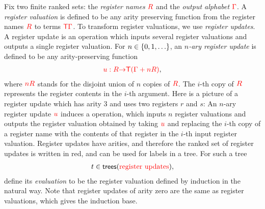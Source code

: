 Fix two finite ranked sets: the \emph{register names} ${{\color{red}{R}}}$ and the \emph{output alphabet} ${\color{red}{\Gamma}}$.
A \emph{register valuation} is defined to be any arity preserving function from the register names ${{\color{red}{R}}}$ to terms ${\color{red}{\mathsf T}} {\color{red}{\Gamma}}$. 
To transform register valuations, we use \emph{register updates}.  A register update is an operation which inputs several  register valuations and outputs a single register valuation. For  $n \in \{0,1,\ldots\}$, an \emph{$n$-ary register update}  is defined to be any arity-preserving function
\begin{align*}
    {\color{red}{u : {{\color{red}{R}}}{\color{red}{\to}}{\color{red}{\mathsf T}}( {\color{red}{\Gamma}}+ n{{\color{red}{R}}})}},
\end{align*}
where ${\color{red}{nR}}$ stands for the disjoint union of $n$ copies of ${{\color{red}{R}}}$. The $i$-th copy of ${{\color{red}{R}}}$ represents the register contents in the $i$-th argument.
Here is a picture of a register update which has arity 3 and uses two registers $r$ and $s$:
An $n$-ary register update ${\color{red}{u}}$ induces a operation, which inputs  $n$ register valuations and  outputs the  register valuation obtained by  taking ${\color{red}{u}}$ and replacing the $i$-th copy of a register name with the  contents of that register in the $i$-th input register valuation. 
Register updates have arities, and therefore the ranked set of register updates is written in red, and can be used for labels in a tree. For such a  tree   
\begin{align*}
    t \in  \mathsf {trees}({\color{red}{\text{register updates}}}),
\end{align*}
define its \emph{evaluation} to be the register valuation defined by induction in the natural way. Note that register updates of arity zero are the same as register valuations, which gives the induction base.


